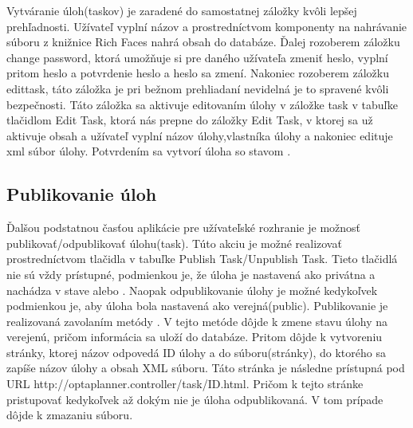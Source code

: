 Vytváranie úloh(taskov) je zaradené do samostatnej záložky kvôli lepšej prehľadnosti. Užívateľ vyplní názov a prostredníctvom komponenty na nahrávanie súboru z knižnice Rich Faces nahrá obsah do databáze. Ďalej rozoberem záložku change password, ktorá umožňuje si pre daného užívateľa zmeniť heslo, vyplní pritom heslo a potvrdenie heslo a heslo sa zmení. Nakoniec rozoberem záložku edittask, táto záložka je pri bežnom prehliadaní nevidelná je to spravené kvôli bezpečnosti. Táto záložka sa aktivuje editovaním úlohy v záložke task v tabuľke tlačidlom Edit Task, ktorá nás prepne do záložky Edit Task, v ktorej sa už aktivuje obsah a užívateľ vyplní názov úlohy,vlastníka úlohy a nakoniec edituje xml súbor úlohy. Potvrdením sa vytvorí úloha so stavom .


\subsection{Publikovanie úloh}
Ďalšou podstatnou časťou aplikácie pre užívateľské rozhranie je možnosť publikovať/odpublikovať úlohu(task). Túto akciu je možné realizovať prostredníctvom tlačidla v tabuľke Publish Task/Unpublish Task. Tieto tlačidlá nie sú vždy prístupné, podmienkou je, že úloha je nastavená ako privátna a nachádza v stave  alebo . Naopak odpublikovanie úlohy je možné kedykoľvek podmienkou je, aby úloha bola nastavená ako verejná(public). Publikovanie je realizovaná zavolaním metódy . V tejto metóde dôjde k zmene stavu úlohy na verejenú, pričom informácia sa uloží do databáze. Pritom dôjde k vytvoreniu stránky, ktorej názov odpovedá ID úlohy a do súboru(stránky), do ktorého sa zapíše názov úlohy a obsah XML súboru. Táto stránka je následne prístupná pod URL http://optaplanner.controller/task/ID.html. Pričom k tejto stránke pristupovať kedykoľvek až dokým nie je úloha odpublikovaná. V tom prípade dôjde k zmazaniu súboru.

